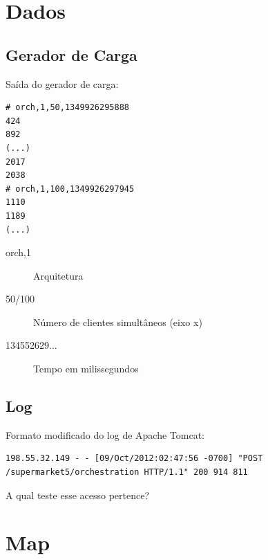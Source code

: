\documentclass{beamer}
\begin{document}
\section{Dados}

\subsection{Gerador de Carga}
\begin{frame}[fragile]
Saída do gerador de carga:

\begin{verbatim}
# orch,1,50,1349926295888
424
892
(...)
2017
2038
# orch,1,100,1349926297945
1110
1189
(...)
\end{verbatim}

\begin{description}
\item[orch,1] Arquitetura
\item[50/100] Número de clientes simultâneos (eixo x)
\item[134552629...] Tempo em milissegundos
\end{description}
\end{frame}

\subsection{Log}
\begin{frame}[fragile]
Formato modificado do log de Apache Tomcat:
\begin{verbatim}
198.55.32.149 - - [09/Oct/2012:02:47:56 -0700] "POST
/supermarket5/orchestration HTTP/1.1" 200 914 811
\end{verbatim}
A qual teste esse acesso pertence?
\end{frame}

\section{Map}
\begin{frame}
\end{frame}
\end{document}
